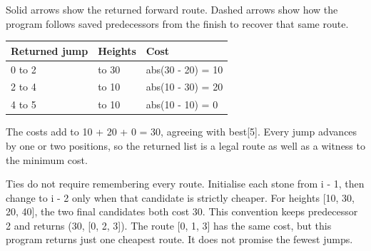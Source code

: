 \documentclass[11pt,a4paper,oneside]{report}
\newcommand{\picturecaption}[1]{\par{\small\color{quiet}#1}\par\medskip}
\begin{document}
\begin{center}\end{center}\picturecaption{Solid arrows show the returned forward route. Dashed arrows show how the program follows saved predecessors from the finish to recover that same route.}
\par\medskip\begingroup\small\setlength{\tabcolsep}{4pt}\renewcommand{\arraystretch}{1.3}\begin{tabularx}{\linewidth}{>{\raggedright\arraybackslash}X>{\raggedright\arraybackslash}X>{\raggedright\arraybackslash}X}\toprule\textbf{Returned jump} & \textbf{Heights} & \textbf{Cost}\\\midrule
{}0 to 2 & 20 to 30 & abs(30 - 20) = 10\\
{}2 to 4 & 30 to 10 & abs(10 - 30) = 20\\
{}4 to 5 & 10 to 10 & abs(10 - 10) = 0\\
\bottomrule\end{tabularx}\endgroup\par\medskip
The costs add to 10 + 20 + 0 = 30, agreeing with best[5]. Every jump advances by one or two positions, so the returned list is a legal route as well as a witness to the minimum cost.

Ties do not require remembering every route. Initialise each stone from i - 1, then change to i - 2 only when that candidate is strictly cheaper. For heights [10, 30, 20, 40], the two final candidates both cost 30. This convention keeps predecessor 2 and returns (30, [0, 2, 3]). The route [0, 1, 3] has the same cost, but this program returns just one cheapest route. It does not promise the fewest jumps.
\end{document}
